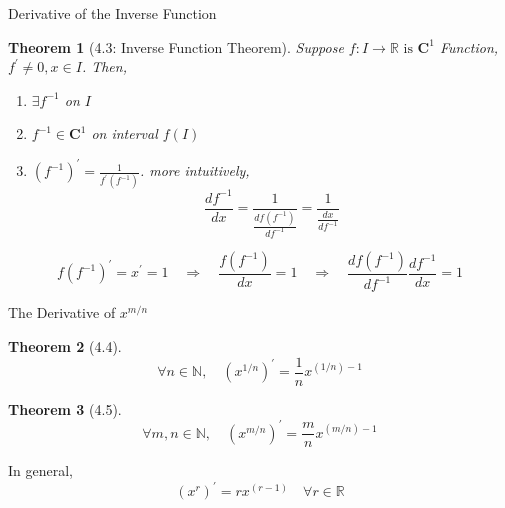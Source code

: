 \documentclass[final]{beamer}
\newtheorem{thm}{Theorem}
\begin{document}
\begin{frame}[t]{Derivative of the Inverse Function}
	\begin{thm}
		[4.3: Inverse Function Theorem] Suppose $f:I\rightarrow \mathbb{R} \text{ is } \mathbf{C}^1$ Function, $f^\prime \neq 0, x\in I$. Then,
		\begin{enumerate}
			\item $\exists f^{-1}$ on $I$
			\item $f^{-1}\in \mathbf{C}^1$ on interval $f(I)$
			\item $(f^{-1})^\prime = \frac{1}{f^\prime(f^{-1})}$. more intuitively, 
			\[
				\frac{df^{-1}}{dx} = \frac{1}{\frac{df(f^{-1})}{df^{-1}}}=\frac{1}{\frac{dx}{df^{-1}}}
			\]
		\end{enumerate}
	\end{thm}
	\[
		f(f^{-1})^\prime = x^\prime = 1 \quad\Rightarrow\quad \frac{f(f^{-1})}{dx}=1 \quad\Rightarrow\quad \frac{df(f^{-1})}{df^{-1}}\frac{df^{-1}}{dx}=1
	\]
\end{frame}

\begin{frame}[t]{The Derivative of $x^{m/n}$}
	\begin{thm}
		[4.4] \[
			\forall n\in\mathbb{N},\quad (x^{1/n})^\prime = \frac{1}{n} x^{(1/n)-1}
		\]
	\end{thm}
	\begin{thm}
		[4.5] \[
			\forall m,n\in\mathbb{N},\quad (x^{m/n})^\prime = \frac{m}{n} x^{(m/n)-1}
		\]
	\end{thm}
	In general, 
	\[
		(x^r)^\prime = rx^{(r-1)}\quad \forall r\in\mathbb{R}
	\]
\end{frame}

\end{document}
